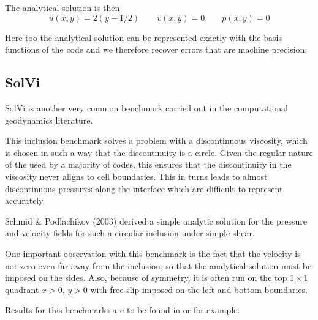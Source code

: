 \documentclass[a4paper]{article}
\begin{document}
The analytical solution is then
\[
u(x,y)=2(y-1/2)
\qquad
v(x,y)=0
\qquad
p(x,y)=0
\]

Here too the analytical solution can be represented exactly
with the basis functions of the code
and we therefore recover errors that are machine precision:




\subsection{SolVi}

SolVi is another very common benchmark carried out in the computational 
geodynamics literature.

This inclusion benchmark solves a problem with a discontinuous viscosity, 
which is chosen in such a way that the discontinuity is a circle.                
Given the regular nature of the used by a majority of codes, 
this ensures that the discontinuity in the viscosity never aligns to cell boundaries.
This in turns leads to almost discontinuous pressures along the interface which are difficult 
to represent accurately.

Schmid \& Podlachikov (2003) \cite{scpo03}
derived a simple analytic solution for the pressure and velocity fields for such a circular
inclusion under simple shear.

One important observation with this benchmark is the fact that the velocity is not zero even far 
away from the inclusion, so that the analytical solution must be imposed on the sides.
Also, because of symmetry, it is often run on the top $1\times 1$ quadrant $x>0$, $y>0$ with 
free slip imposed on the left and bottom boundaries.

Results for this benchmarks are to be found in \textcite{krhb12} or \textcite{gemd13} 
for example. 
\end{document}
